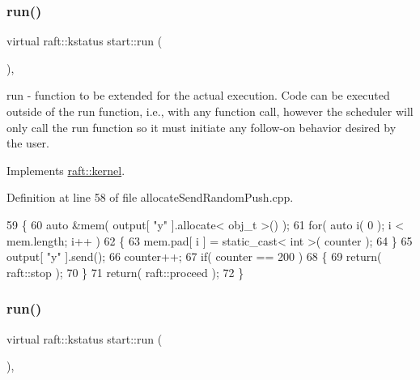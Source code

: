 \subsubsection{\texorpdfstring{run()}{run()}\hspace{0.1cm}{\footnotesize\ttfamily [4/6]}}
{\footnotesize\ttfamily virtual raft\+::kstatus start\+::run (\begin{DoxyParamCaption}{ }\end{DoxyParamCaption})\hspace{0.3cm}{\ttfamily [inline]}, {\ttfamily [virtual]}}

run -\/ function to be extended for the actual execution. Code can be executed outside of the run function, i.\+e., with any function call, however the scheduler will only call the run function so it must initiate any follow-\/on behavior desired by the user. 

Implements \hyperlink{classraft_1_1kernel_a05094286d7577360fb1b91c91fc05901}{raft\+::kernel}.



Definition at line 58 of file allocate\+Send\+Random\+Push.\+cpp.


\begin{DoxyCode}
59     \{
60         \textcolor{keyword}{auto} &mem( output[ \textcolor{stringliteral}{"y"} ].allocate< obj\_t >() );
61         \textcolor{keywordflow}{for}( \textcolor{keyword}{auto} i( 0 ); i < mem.length; i++ )
62         \{
63             mem.pad[ i ] = \textcolor{keyword}{static\_cast<} \textcolor{keywordtype}{int} \textcolor{keyword}{>}( counter );
64         \}
65         output[ \textcolor{stringliteral}{"y"} ].send();
66         counter++;
67         \textcolor{keywordflow}{if}( counter == 200 )
68         \{
69             \textcolor{keywordflow}{return}( raft::stop );
70         \}
71         \textcolor{keywordflow}{return}( raft::proceed );
72     \}
\end{DoxyCode}
\hypertarget{classstart_a4c076d756e2846f51e54452853a9ed6d}{}\label{classstart_a4c076d756e2846f51e54452853a9ed6d} 
\subsubsection{\texorpdfstring{run()}{run()}\hspace{0.1cm}{\footnotesize\ttfamily [5/6]}}
{\footnotesize\ttfamily virtual raft\+::kstatus start\+::run (\begin{DoxyParamCaption}{ }\end{DoxyParamCaption})\hspace{0.3cm}{\ttfamily [inline]}, {\ttfamily [virtual]}}

